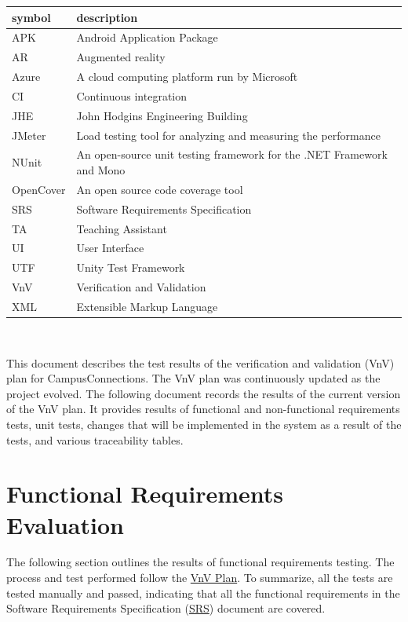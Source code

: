 \documentclass[12pt, titlepage]{article}
\begin{document}
\renewcommand{\arraystretch}{1.2}
\begin{tabular}{l l} 
  \toprule		
  \textbf{symbol} & \textbf{description}\\
  \midrule 
  APK & Android Application Package\\
  \midrule 
  AR & Augmented reality\\
  \midrule 
  Azure & A cloud computing platform run by Microsoft\\
  \midrule 
  CI & Continuous integration\\
  \midrule 
  JHE & John Hodgins Engineering Building\\
  \midrule 
  JMeter & Load testing tool for analyzing and measuring the performance\\
  \midrule 
  NUnit & An open-source unit testing framework for the .NET Framework and Mono\\
  \midrule 
  OpenCover & An open source code coverage tool\\
  \midrule 
  SRS & Software Requirements Specification\\
  \midrule
  TA & Teaching Assistant\\
  \midrule 
  UI & User Interface\\
  \midrule 
  UTF & Unity Test Framework\\
  \midrule 
  VnV & Verification and Validation\\
  \midrule 
  XML & Extensible Markup Language\\
  \bottomrule
\end{tabular}\\

\newpage

\tableofcontents

\listoftables %

\listoffigures %

\newpage


This document describes the test results of the verification and validation (VnV) plan for CampusConnections. The VnV plan was continuously updated as the project evolved. The following document records the results of the current version of the VnV plan. It provides results of functional and non-functional requirements tests, unit tests, changes that will be implemented in the system as a result of the tests, and various traceability tables.


\section{Functional Requirements Evaluation}
The following section outlines the results of functional requirements testing. The process and test performed follow the \href{https://github.com/beatlepie/4G06CapstoneProjectTeam2/blob/main/docs/VnVPlan/VnVPlan.pdf}{VnV Plan}. To summarize, all the tests are tested manually and passed, indicating that all the functional requirements in the Software Requirements Specification (\href{https://github.com/beatlepie/4G06CapstoneProjectTeam2/blob/main/docs/SRS/SRS.pdf}{SRS}) document are covered.
\end{document}
